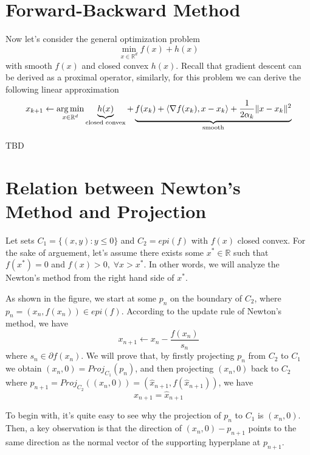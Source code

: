 \section{Forward-Backward Method}
Now let's consider the general optimization problem
\begin{equation*}
    \min_{x \in \mathbb{R}^d} f(x) + h(x)
\end{equation*}
with smooth $f(x)$ and closed convex $h(x)$. Recall that gradient descent can be derived as a proximal operator, similarly, for this problem we can derive the following linear approximation
\begin{equation*}
    x_{k+1} \leftarrow \operatorname*{arg\,min}_{x \in \mathbb{R}^d} \underbrace{h(x)}_{\text{closed convex}} + \underbrace{f(x_k) + \langle \nabla f(x_k), x-x_k \rangle + \frac{1}{2\alpha_k} \| x - x_k \|^2}_{\text{smooth}}
\end{equation*}

TBD

\section{Relation between Newton's Method and Projection}
Let sets $C_1 = \{ (x, y) : y \leq 0\}$ and $C_2 = epi(f)$ with $f(x)$ closed convex. For the sake of arguement, let's assume there exists some $x^* \in \mathbb{R}$ such that $f(x^*) = 0$ and $f(x) > 0, \; \forall x > x^*$. In other words, we will analyze the Newton's method from the right hand side of $x^*$.

As shown in the figure, we start at some $p_n$ on the boundary of $C_2$, where $p_n = (x_n, f(x_n)) \in epi(f)$. According to the update rule of Newton's method, we have
\begin{equation*}
    x_{n+1} \leftarrow x_n - \frac{f(x_n)}{s_n}
\end{equation*}
where $s_n \in \partial f(x_n)$. We will prove that, by firstly projecting $p_n$ from $C_2$ to $C_1$ we obtain $(x_n, 0) = Proj_{C_1}(p_n)$, and then projecting $(x_n, 0)$ back to $C_2$ where $p_{n+1} = Proj_{C_2}((x_n, 0)) = (\hat{x}_{n+1}, f(\hat{x}_{n+1}))$, we have 
\begin{equation*}
    x_{n+1} = \hat{x}_{n+1}
\end{equation*}

To begin with, it's quite easy to see why the projection of $p_n$ to $C_1$ is $(x_n, 0)$. Then, a key observation is that the direction of $(x_n, 0) - p_{n+1}$ points to the same direction as the normal vector of the supporting hyperplane at $p_{n+1}$. 

